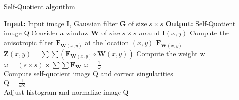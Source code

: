 \documentclass{article}
\begin{document}
\begin{algorithm}
  \caption{Self-Quotient algorithm}
  \begin{algorithmic}[0]
  	\State \textbf{Input:} Input image \textbf{I}, Gaussian filter \textbf{G} of size $s \times s$
  	\State \textbf{Output:} Self-Quotient image Q
  		\State Consider a window \textbf{W} of size $s \times s$ around \textbf{I}$(x,y)$
  		\State Compute the anisotropic filter $\mathbf{F}_{\mathbf{W}(x,y)}$ at the location $(x,y)$
  		\State $\mathbf{F}_{\mathbf{W}(x,y)} = $
  		\State $\mathbf{Z}(x,y) = \sum \sum (\mathbf{F}_{\mathbf{W}(x,y)} \circ \mathbf{W}(x,y))$
  		\State Compute the weight w
  		\State $\omega = (s \times s) \times \sum \sum \mathbf{F}_{\mathbf{W}}$
  		\State $\omega = \frac{1}{\omega}$
  	\EndFor
	\\
	Compute self-quotient image Q and correct singularities\\
	$\mathrm{Q = \frac{I}{\omega Z}}$\\
	Adjust histogram and normalize image Q
  \end{algorithmic}
\end{algorithm}
\end{document}
